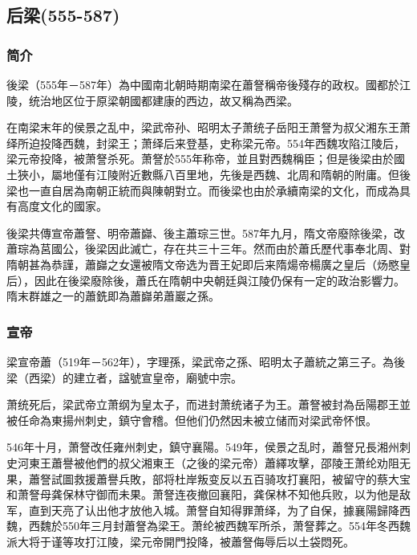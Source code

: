 
\subsection{后梁(555-587)}

\subsubsection{简介}

後梁（555年－587年）為中國南北朝時期南梁在蕭詧稱帝後殘存的政权。國都於江陵，统治地区位于原梁朝國都建康的西边，故又稱為西梁。

在南梁末年的侯景之乱中，梁武帝孙、昭明太子萧统子岳阳王萧詧为叔父湘东王萧绎所迫投降西魏，封梁王；萧绎后来登基，史称梁元帝。554年西魏攻陷江陵后，梁元帝投降，被萧詧杀死。萧詧於555年称帝，並且對西魏稱臣；但是後梁由於國土狹小，屬地僅有江陵附近數縣八百里地，先後是西魏、北周和隋朝的附庸。但後梁也一直自居為南朝正統而與陳朝對立。而後梁也由於承續南梁的文化，而成為具有高度文化的國家。

後梁共傳宣帝蕭詧、明帝蕭巋、後主蕭琮三世。587年九月，隋文帝廢除後梁，改蕭琮為莒國公，後梁因此滅亡，存在共三十三年。然而由於蕭氏歷代事奉北周、對隋朝甚為恭謹，蕭巋之女還被隋文帝选为晋王妃即后来隋煬帝楊廣之皇后（炀愍皇后），因此在後梁廢除後，蕭氏在隋朝中央朝廷與江陵仍保有一定的政治影響力。隋末群雄之一的蕭銑即為蕭巋弟蕭巖之孫。

\subsubsection{宣帝}

梁宣帝蕭（519年－562年），字理孫，梁武帝之孫、昭明太子蕭統之第三子。為後梁（西梁）的建立者，諡號宣皇帝，廟號中宗。

萧统死后，梁武帝立萧纲为皇太子，而进封萧统诸子为王。蕭詧被封為岳陽郡王並被任命為東揚州刺史，鎮守會稽。但他们仍然因未被立储而对梁武帝怀恨。

546年十月，萧詧改任雍州刺史，鎮守襄陽。549年，侯景之乱时，蕭詧兄長湘州刺史河東王蕭譽被他們的叔父湘東王（之後的梁元帝）蕭繹攻擊，邵陵王萧纶劝阻无果，蕭詧試圖救援蕭譽兵敗，部将杜岸叛变反以五百骑攻打襄阳，被留守的蔡大宝和萧詧母龚保林守御而未果。萧詧连夜撤回襄阳，龚保林不知他兵败，以为他是敌军，直到天亮了认出他才放他入城。萧詧自知得罪萧绎，为了自保，據襄陽歸降西魏，西魏於550年三月封蕭詧為梁王。萧纶被西魏军所杀，萧詧葬之。554年冬西魏派大将于谨等攻打江陵，梁元帝開門投降，被蕭詧侮辱后以土袋悶死。

